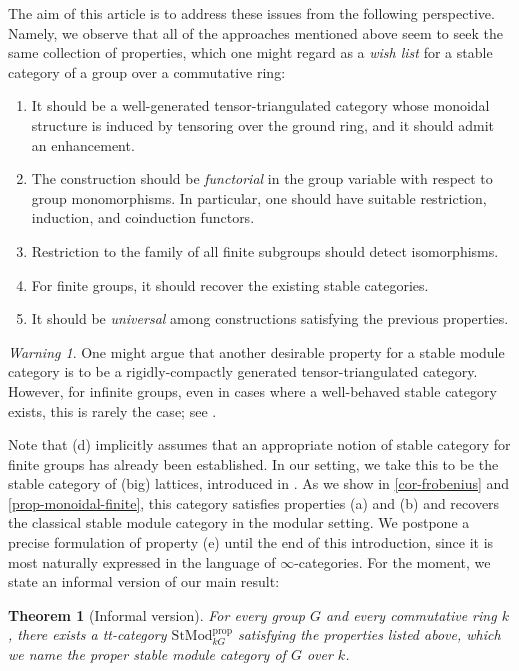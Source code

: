 \documentclass{amsart}
\numberwithin{equation}{section}%
\newtheorem*{introtheorem}{Theorem}
\theoremstyle{remark}
\newtheorem{warning}[equation]{Warning}
\begin{document}
The aim of this article is to address these issues from the following perspective. Namely, we observe that all of the approaches mentioned above seem to seek the same collection of properties, which one might regard as a \textit{wish list} for a stable category of a group over a commutative ring:

\begin{enumerate}
\item It should be a well-generated tensor-triangulated category whose monoidal structure is induced by tensoring over the ground ring, and it should admit an enhancement.
\item The construction should be \textit{functorial} in the group variable with respect to group monomorphisms. In particular, one should have suitable restriction, induction, and coinduction functors.
\item Restriction to the family of all finite subgroups should detect isomorphisms.
\item For finite groups, it should recover the existing stable categories. 
\item It should be \textit{universal} among constructions satisfying the previous properties.
\end{enumerate}

\begin{warning}
  One might argue that another desirable property  for a stable module category is to be a rigidly-compactly generated tensor-triangulated category. However, for infinite groups, even in cases where a well-behaved stable category exists, this is rarely the case; see \cite[Remark 2.7]{gom24b}.
\end{warning}

Note that (d) implicitly assumes that an appropriate notion of stable category for finite groups has already been established. In our setting, we take this to be the stable category of (big) lattices, introduced in \cite{BBIKP25}. As we show in \cref{cor-frobenius} and \cref{prop-monoidal-finite}, this category satisfies properties (a) and (b) and recovers the classical stable module category in the modular setting. We postpone a precise formulation of property (e) until the end of this introduction, since it is most naturally expressed in the language of $\infty$-categories. 
For the moment, we state an informal version of our main result:



\begin{introtheorem}[Informal version]
For every group $G$ and every commutative ring $k$, there exists a tt-category $\mathrm{StMod}^{\mathrm{prop}}_{kG}$ satisfying the properties listed above, which we name the proper stable module category of $G$ over $k$.
\end{introtheorem}
\end{document}
